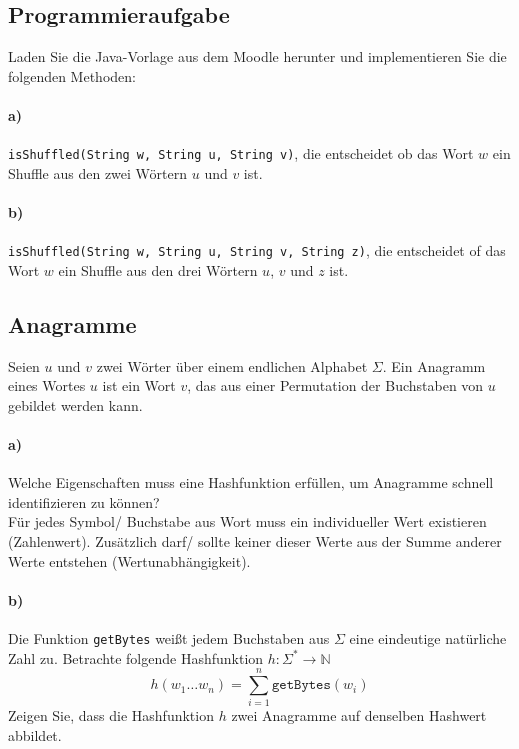 \documentclass[paper=a4, fontsize=11pt]{scrartcl}
\numberwithin{equation}{section}
\numberwithin{figure}{section}
\numberwithin{table}{section}
\begin{document}
\subsection{Programmieraufgabe}
Laden Sie die Java-Vorlage aus dem Moodle herunter und implementieren Sie die folgenden Methoden:

\paragraph{a)}
 \texttt{isShuffled(String w, String u, String v)}, die entscheidet ob das Wort $w$ ein Shuffle aus den zwei Wörtern $u$ und $v$ ist. \\
 
\paragraph{b)}
 \texttt{isShuffled(String w, String u, String v, String z)}, die entscheidet of das Wort $w$ ein Shuffle aus den drei Wörtern $u$, $v$ und $z$ ist.

\subsection{Anagramme}
Seien $u$ und $v$ zwei Wörter über einem endlichen Alphabet $\Sigma$. Ein Anagramm eines Wortes $u$ ist ein Wort $v$, das aus einer Permutation der Buchstaben von $u$ gebildet werden kann.

\paragraph{a)}
Welche Eigenschaften muss eine Hashfunktion erfüllen, um Anagramme schnell identifizieren zu können? \\

Für jedes Symbol/ Buchstabe aus Wort muss ein individueller Wert existieren (Zahlenwert). Zusätzlich darf/ sollte keiner dieser Werte aus der Summe anderer Werte entstehen (Wertunabhängigkeit).

\paragraph{b)} 
Die Funktion \texttt{getBytes} weißt jedem Buchstaben aus $\Sigma$ eine eindeutige natürliche Zahl zu. Betrachte folgende Hashfunktion $h\colon \Sigma^* \rightarrow \mathbb N$
$$h(w_1\dots w_n)= \sum \limits_{i=1}^n \mathtt{getBytes}(w_i)$$
Zeigen Sie, dass die Hashfunktion $h$ zwei Anagramme auf denselben Hashwert abbildet. \\
\end{document}
